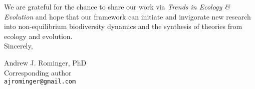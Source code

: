 \documentclass[12pt]{article}
\begin{document}
We are grateful for the chance to share our work via {\it Trends in
  Ecology \& Evolution} and hope that our framework can initiate and
invigorate new research into non-equilibrium biodiversity dynamics and
the synthesis of theories from ecology and evolution.
\\

\noindent
Sincerely,
\vspace{2em}

\noindent
Andrew J. Rominger, PhD \\
Corresponding author \\
{\tt ajrominger@gmail.com}
\end{document}
